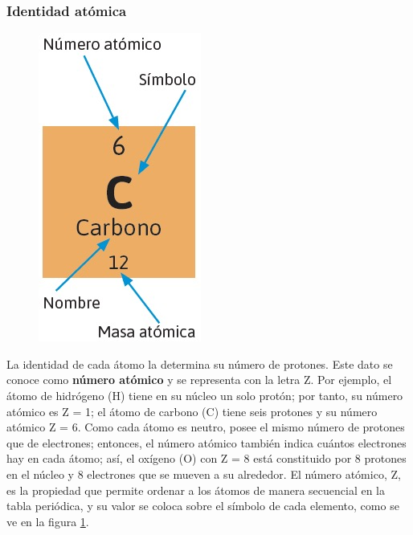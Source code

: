 \documentclass[11pt]{book}
\begin{document}
\subsubsection{Identidad atómica}

\begin{figure}
  \centering
  \includegraphics[width=0.45\linewidth]{eolementoCarbono.jpg}
  \label{fig:eolementoCarbono}
\end{figure}%

La identidad de cada átomo la determina su número de protones. Este dato se conoce como \textbf{número atómico} y
se representa con la letra Z. Por ejemplo, el átomo de hidrógeno (H) tiene en su núcleo un solo protón;
por tanto, su número atómico es Z = 1; el átomo de carbono (C) tiene seis protones y su número atómico
Z = 6. Como cada átomo es neutro, posee el mismo número de protones que de electrones; entonces, el número
atómico también indica cuántos electrones hay en cada átomo; así, el oxígeno (O) con Z = 8 está constituido
por 8 protones en el núcleo y 8 electrones que se mueven a su alrededor. El número atómico, Z, es la propiedad
que permite ordenar a los átomos de manera secuencial en la tabla periódica, y su valor se coloca sobre el símbolo
de cada elemento, como se ve en la figura \ref{fig:eolementoCarbono}.\\
\end{document}
